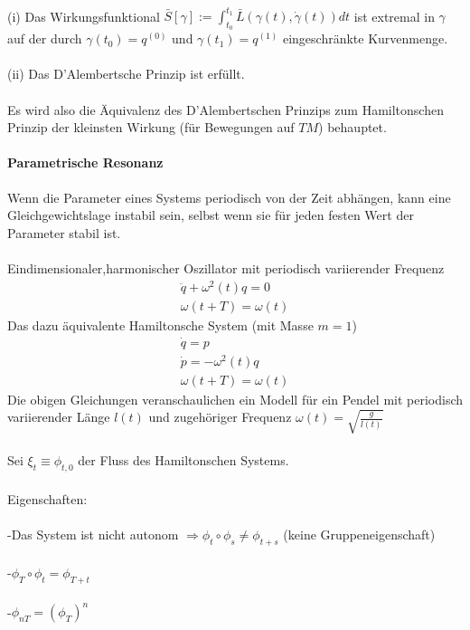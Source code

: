\documentclass[10pt,a4paper]{article}
\begin{document}
\\
(i) Das Wirkungsfunktional $\bar{S} [\gamma]:= \int_{t_0}^{t_1} \bar{L}(\gamma(t), \dot{\gamma}(t))dt $ ist extremal in $ \gamma$ auf der durch $ \gamma (t_0)=q^{(0)} $ und $ \gamma (t_1)=q^{(1)} $ eingeschränkte Kurvenmenge.\\
\\
(ii) Das D'Alembertsche Prinzip ist erfüllt.\\
\\
Es wird also die Äquivalenz des D'Alembertschen Prinzips zum Hamiltonschen Prinzip der kleinsten Wirkung (für Bewegungen auf $TM$) behauptet.
\paragraph{Parametrische Resonanz} $\,\  $ \\
Wenn die Parameter eines Systems periodisch von der Zeit abhängen, kann eine Gleichgewichtslage instabil sein, selbst wenn sie für jeden festen Wert der Parameter stabil ist.\\
\\
Eindimensionaler,harmonischer Oszillator mit periodisch variierender Frequenz
\begin{align}
\ddot{q}+\omega^2(t)q=0 \\
\omega(t+T)=\omega (t)
\end{align}
Das dazu äquivalente Hamiltonsche System (mit Masse $m=1$)
\begin{align}
\dot{q}=p\\
\dot{p}=- \omega^2(t)q \\
\omega(t+T)=\omega (t)
\end{align}
Die obigen Gleichungen veranschaulichen ein Modell für ein Pendel mit periodisch variierender Länge $ l(t) $ und zugehöriger Frequenz $ \omega (t)= \sqrt{\frac{g}{l(t)}} $ \\
\\
Sei $\xi_t \equiv \phi_{t,0} $ der Fluss des Hamiltonschen Systems.\\
\\
Eigenschaften:\\
\\
-Das System ist nicht autonom $\Rightarrow \phi_t \circ \phi_s \neq \phi_{t+s} $ (keine Gruppeneigenschaft)\\
\\
-$\phi_T \circ \phi_{t}= \phi_{T+t} $ \\
\\
-$\phi_{nT}= (\phi_T)^n $\\
\end{document}
